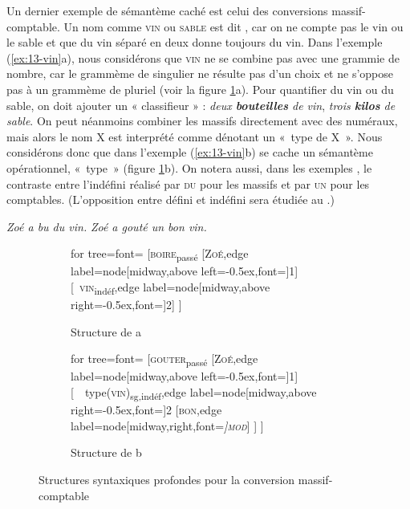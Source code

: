Un dernier exemple de sémantème caché est celui des conversions massif-comptable. Un nom comme \textsc{vin} ou \textsc{sable} est dit , car on ne compte pas le vin ou le sable et que du vin séparé en deux donne toujours du vin. Dans l’exemple (\ref{ex:13-vin}a), nous considérons que \textsc{vin} ne se combine pas avec une grammie de nombre, car le grammème de singulier ne résulte pas d’un choix et ne s’oppose pas à un grammème de pluriel (voir la figure \ref{fig:13-vin}a). Pour quantifier du vin ou du sable, on doit ajouter un « classifieur » : \textit{deux \textbf{bouteilles} de vin}, \textit{trois \textbf{kilos} de sable}. On peut néanmoins combiner les massifs directement avec des numéraux, mais alors le nom X est interprété comme dénotant un «~type de X~». Nous considérons donc que dans l’exemple (\ref{ex:13-vin}b) se cache un sémantème opérationnel, «~type~» (figure \ref{fig:13-vin}b). On notera aussi, dans les exemples , le contraste entre l’indéfini réalisé par \textsc{du} pour les massifs et par \textsc{un} pour les comptables. (L'opposition entre défini et indéfini sera étudiée au .)

\ea\label{ex:13-vin}
\ea \textit{Zoé a bu du vin.}
\ex \textit{Zoé a gouté un bon vin.}\z\z

\begin{figure}
	\begin{subfigure}[b]{0.5\textwidth}
		\centering
		\begin{forest} for tree={font=\normalfont}
			[\textsc{boire}\textsubscript{passé}
				[\textsc{Zoé},edge label={node[midway,above left=-0.5ex,font=\footnotesize]{1}}]
				[\ \textsc{vin}\textsubscript{indéf},edge label={node[midway,above right=-0.5ex,font=\footnotesize]{2}}]
			]
		\end{forest}
		\caption{Structure de a}
	\end{subfigure}%
	\hfill
	\begin{subfigure}[b]{0.5\textwidth}
		\centering
		\begin{forest} for tree={font=\normalfont}
			[\textsc{gouter}\textsubscript{passé}
				[\textsc{Zoé},edge label={node[midway,above left=-0.5ex,font=\footnotesize]{1}}]
				[\ \ type(\textsc{vin})\textsubscript{sg,indéf},edge label={node[midway,above right=-0.5ex,font=\footnotesize]{2}}
					[\textsc{bon},edge label={node[midway,right,font=\footnotesize\itshape]{\textsc{mod}}}]
				]
			]
		\end{forest}
		\caption{Structure de b}
	\end{subfigure}
\caption{Structures syntaxiques profondes pour la conversion massif-comptable\label{fig:13-vin}}
\end{figure}

